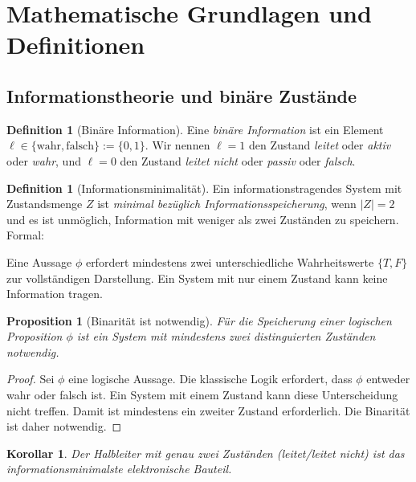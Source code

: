 \documentclass[12pt, a4paper]{article}
\newtheorem{proposition}[theorem]{Proposition}
\newtheorem{corollary}[theorem]{Korollar}
\theoremstyle{definition}
\newtheorem{definition}[theorem]{Definition}
\theoremstyle{remark}
\newcommand{\Bool}{\{\mathrm{wahr}, \mathrm{falsch}\}}
\newcommand{\leit}{\ell}
\begin{document}
\section{Mathematische Grundlagen und Definitionen}
\label{sec:grundlagen}

\subsection{Informationstheorie und binäre Zustände}
\label{subsec:informationstheorie}

\begin{definition}[Binäre Information]
\label{def:binaere_info}
Eine \emph{binäre Information} ist ein Element $\leit \in \Bool := \{0, 1\}$. Wir nennen $\leit = 1$ den Zustand \emph{leitet} oder \emph{aktiv} oder \emph{wahr}, und $\leit = 0$ den Zustand \emph{leitet nicht} oder \emph{passiv} oder \emph{falsch}.
\end{definition}

\begin{definition}[Informationsminimalität]
\label{def:informationsminimalität}
Ein informationstragendes System mit Zustandsmenge $Z$ ist \emph{minimal bezüglich Informationsspeicherung}, wenn $|Z| = 2$ und es ist unmöglich, Information mit weniger als zwei Zuständen zu speichern. Formal:

Eine Aussage $\phi$ erfordert mindestens zwei unterschiedliche Wahrheitswerte $\{T, F\}$ zur vollständigen Darstellung. Ein System mit nur einem Zustand kann keine Information tragen.
\end{definition}

\begin{proposition}[Binarität ist notwendig]
\label{prop:binaere_notwendigkeit}
Für die Speicherung einer logischen Proposition $\phi$ ist ein System mit mindestens zwei distinguierten Zuständen notwendig.
\end{proposition}

\begin{proof}
Sei $\phi$ eine logische Aussage. Die klassische Logik erfordert, dass $\phi$ entweder wahr oder falsch ist. Ein System mit einem Zustand kann diese Unterscheidung nicht treffen. Damit ist mindestens ein zweiter Zustand erforderlich. Die Binarität ist daher notwendig.
\end{proof}

\begin{corollary}
Der Halbleiter mit genau zwei Zuständen (leitet/leitet nicht) ist das informationsminimalste elektronische Bauteil.
\end{corollary}
\end{document}
